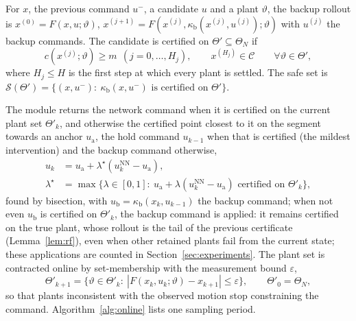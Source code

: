 \documentclass[final,5p,times,twocolumn]{elsarticle}
\begin{document}
\begin{definition}\label{def:cert}
For $x$, the previous command $u^-$, a candidate $u$ and a plant $\vartheta$, the backup rollout is $x^{(0)}=F(x,u;\vartheta)$, $x^{(j+1)}=F(x^{(j)},\kappa_{\mathrm b}(x^{(j)},u^{(j)});\vartheta)$ with $u^{(j)}$ the backup commands. The candidate is certified on $\Theta'\subseteq\Theta_N$ if
\begin{equation}\label{eq:cert}
c(x^{(j)};\vartheta)\ge m\ \ (j=0,\dots,H_j),\qquad x^{(H_j)}\in\mathcal C\qquad\forall\vartheta\in\Theta',
\end{equation}
where $H_j\le H$ is the first step at which every plant is settled. The safe set is $\mathcal S(\Theta')=\{(x,u^-):\ \kappa_{\mathrm b}(x,u^-)\text{ is certified on }\Theta'\}$.
\end{definition}
The module returns the network command when it is certified on the current plant set $\Theta'_k$, and otherwise the certified point closest to it on the segment towards an anchor $u_{\mathrm a}$, the hold command $u_{k-1}$ when that is certified (the mildest intervention) and the backup command otherwise,
\begin{equation}\label{eq:filter}
\begin{aligned}u_k&=u_{\mathrm a}+\lambda^\star(u^{\mathrm{NN}}_k-u_{\mathrm a}),\\ \lambda^\star&=\max\{\lambda\in[0,1]:\ u_{\mathrm a}+\lambda(u^{\mathrm{NN}}_k-u_{\mathrm a})\text{ certified on }\Theta'_k\},\end{aligned}
\end{equation}
found by bisection, with $u_{\mathrm b}=\kappa_{\mathrm b}(x_k,u_{k-1})$ the backup command; when not even $u_{\mathrm b}$ is certified on $\Theta'_k$, the backup command is applied: it remains certified on the true plant, whose rollout is the tail of the previous certificate (Lemma~\ref{lem:rf}), even when other retained plants fail from the current state; these applications are counted in Section~\ref{sec:experiments}. The plant set is contracted online by set-membership with the measurement bound $\varepsilon$,
\begin{equation}\label{eq:consistent}
\Theta'_{k+1}=\{\vartheta\in\Theta'_k:\ |F(x_k,u_k;\vartheta)-x_{k+1}|\le\varepsilon\},\qquad \Theta'_0=\Theta_N,
\end{equation}
so that plants inconsistent with the observed motion stop constraining the command. Algorithm~\ref{alg:online} lists one sampling period.
\end{document}
